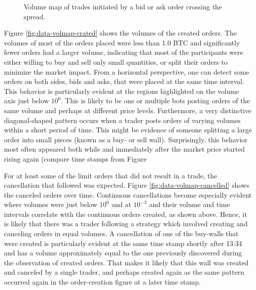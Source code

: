 \begin{figure}[H]
    \centering
    \caption{Volume map of trades initiated by a bid or ask order crossing the spread.}
    \label{fig:data-volmap-traded}
\end{figure}
Figure \ref{fig:data-volmap-crated} shows the volumes of the created orders.
The volumes of most of the orders placed were less than 1.0 BTC and significantly fewer orders had a larger volume, indicating that most of the participants were either willing to buy and sell only small quantities, or split their orders to minimize the market impact.
From a horizontal perspective, one can detect some orders on both sides, bids and asks, that were placed at the same time interval.
This behavior is particularly evident at the regions highlighted on the volume axis just below $10^0$.
This is likely to be one or multiple bots posting orders of the same volume and perhaps at different price levels.
Furthermore, a very distinctive diagonal-shaped pattern occurs when a trader posts orders of varying volumes within a short period of time.
This might be evidence of someone splitting a large order into small pieces (known as a buy- or sell wall).
Surprisingly, this behavior most often appeared both while and immediately after the market price started rising again (compare time stamps from Figure 

For at least some of the limit orders that did not result in a trade, the cancellation that followed was expected.
Figure \ref{fig:data-volmap-cancelled} shows the canceled orders over time.
Continuous cancellations become especially evident where volumes were just below $10^0$ and at $10^{-3}$ and their volume and time intervals correlate with the continuous orders created, as shown above.
Hence, it is likely that there was a trader following a strategy which involved creating and canceling orders in equal volumes.
A cancellation of one of the buy-walls that were created is particularly evident at the same time stamp shortly after 13:34 and has a volume approximately equal to the one previously discovered during the observation of created orders.
That makes it likely that this wall was created and canceled by a single trader, and perhaps created again as the same pattern occurred again in the order-creation figure at a later time stamp.

